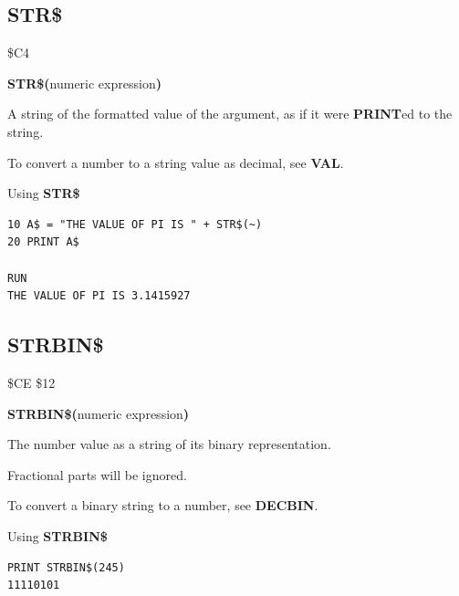 \subsection{STR\$}
\begin{description}[leftmargin=2cm,style=nextline]
\item [Token:]    \$C4

\item [Format:]   {\bf STR\$(}numeric expression{\bf)}

\item [Returns:]  A string of the formatted value of the argument, as if it were {\bf PRINT}ed to the string.

\item [Remakrs:]  To convert a number to a string value as decimal, see {\bf VAL}.

\item [Example:]  Using {\bf STR\$}

\begin{tcolorbox}[colback=black,coltext=white]
\verbatimfont{\codefont}
\begin{verbatim}
10 A$ = "THE VALUE OF PI IS " + STR$(~)
20 PRINT A$

RUN
THE VALUE OF PI IS 3.1415927
\end{verbatim}
\end{tcolorbox}
\end{description}


\newpage
\subsection{STRBIN\$}
\begin{description}[leftmargin=2cm,style=nextline]
\item [Token:]    \$CE \$12

\item [Format:]   {\bf STRBIN\$(}numeric expression{\bf)}

\item [Returns:]  The number value as a string of its binary representation.

\item [Remarks:]  Fractional parts will be ignored.

                  To convert a binary string to a number, see {\bf DECBIN}.

\item [Example:]  Using {\bf STRBIN\$}

\begin{tcolorbox}[colback=black,coltext=white]
\verbatimfont{\codefont}
\begin{verbatim}
PRINT STRBIN$(245)
11110101
\end{verbatim}
\end{tcolorbox}
\end{description}

